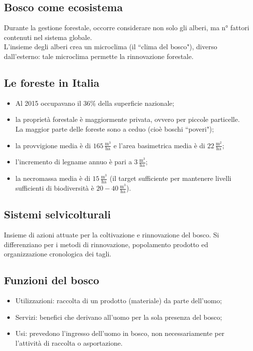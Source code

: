 \documentclass{article}
\begin{document}
\subsection{Bosco come ecosistema}
Durante la gestione forestale, occorre considerare non solo gli alberi, ma n° fattori contenuti nel sistema globale.\\
L'insieme degli alberi crea un microclima (il ``clima del bosco"), diverso dall'esterno: tale microclima permette la rinnovazione forestale.

\subsection{Le foreste in Italia}
\begin{itemize}
    \item Al 2015 occupavano il 36\% della superficie nazionale;
    \item la proprietà forestale è maggiormente privata, ovvero per piccole particelle. La maggior parte delle foreste sono a ceduo (cioè boschi ``poveri");
    \item la provvigione media è di $165 \, \frac{\text{m}^3}{\text{ha}}$ e l'area basimetrica media è di $22 \, \frac{\text{m}^2}{\text{ha}}$;
    \item l'incremento di legname annuo è pari a $3 \, \frac{\text{m}^3}{\text{ha}}$;
    \item la necromassa media è di $15 \, \frac{\text{m}^3}{\text{ha}}$ (il target sufficiente per mantenere livelli sufficienti di biodiversità è $20-40 \, \frac{\text{m}^3}{\text{ha}}$).
\end{itemize}

\subsection{Sistemi selvicolturali}
Insieme di azioni attuate per la coltivazione e rinnovazione del bosco. Si differenziano per i metodi di rinnovazione, popolamento prodotto ed organizzazione cronologica dei tagli.
\subsection{Funzioni del bosco}
\begin{itemize}
    \item Utilizzazioni: raccolta di un prodotto (materiale) da parte dell'uomo;
    \item Servizi: benefici che derivano all'uomo per la sola presenza del bosco;
    \item Usi: prevedono l'ingresso dell'uomo in bosco, non necessariamente per l'attività di raccolta o asportazione.
\end{itemize}
\end{document}
